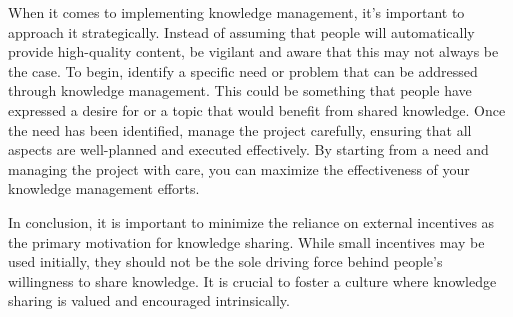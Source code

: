When it comes to implementing knowledge management, it's important to
approach it strategically. Instead of assuming that people will
automatically provide high-quality content, be vigilant and aware that
this may not always be the case. To begin, identify a specific need or
problem that can be addressed through knowledge management. This could
be something that people have expressed a desire for or a topic that
would benefit from shared knowledge. Once the need has been identified,
manage the project carefully, ensuring that all aspects are well-planned
and executed effectively. By starting from a need and managing the
project with care, you can maximize the effectiveness of your knowledge
management efforts.

In conclusion, it is important to minimize the reliance on external
incentives as the primary motivation for knowledge sharing. While small
incentives may be used initially, they should not be the sole driving
force behind people's willingness to share knowledge. It is crucial to
foster a culture where knowledge sharing is valued and encouraged
intrinsically.
